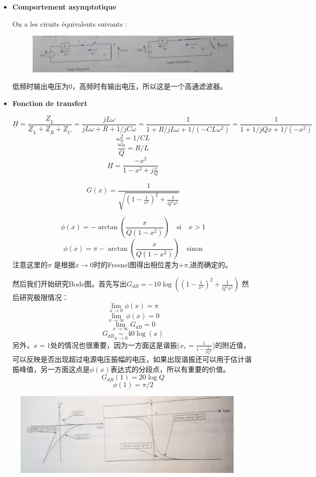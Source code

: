 \documentclass[12pt]{book}
\theoremstyle{definition}\newtheorem{dfn}{Définition}[chapter]
\theoremstyle{plain}\newtheorem{thm}{Théorème}[chapter]
\theoremstyle{plain}\newtheorem{prp}{Proposition}[chapter]
\theoremstyle{plain}\newtheorem{lem}{\bf Lemme}[chapter]
\theoremstyle{plain}\newtheorem{axm}{\bf Axiome}[chapter]
\theoremstyle{plain}\newtheorem{lmm}{\bf Lemme}[chapter]
\theoremstyle{plain}\newtheorem{cor}{\bf Corollaire}[chapter]
\theoremstyle{remark}\newtheorem{rem}{Remarque}[chapter]
\begin{document}
\begin{itemize}
	\item \textbf{Comportement asymptotique}
	
	On a les ciruits équivalents suivants :
\begin{figure}[H]
	\centering
	\includegraphics[scale=0.16]{Filtrage//6}
\end{figure}
低频时输出电压为0，高频时有输出电压，所以这是一个高通滤波器。

\item \textbf{Fonction de transfert}

$$
\underline{H}=\frac{\underline{Z}_L}{\underline{Z}_L+\underline{Z}_R+\underline{Z}_C}=\frac{jL\omega}{jL\omega+R+1/jC\omega}=\frac{1}{1+R/jL\omega+1/(-CL\omega^2)}=\frac{1}{1+1/jQx+1/(-x^2)}
$$
$$
\omega_0^2=1/CL
$$
$$
\frac{\omega_0}{Q}=R/L
$$
$$
\boxed{\underline{H}=\frac{-x^2}{1-x^2+j\frac{x}{Q}}}
$$

$$
G(x)=\frac{1}{\sqrt{(1-\frac{1}{x^2})^2+\frac{1}{Q^2x^2}}}
$$

$$
\phi(x)=-\arctan(\frac{x}{Q(1-x^2)})\quad \text{si}\quad x>1
$$
$$
\phi(x)=\pi-\arctan(\frac{x}{Q(1-x^2)})\quad \text{sinon}
$$
注意这里的$\pi$ 是根据$x\to0$时的Fresnel图得出相位差为$+\pi$,进而确定的。

然后我们开始研究Bode图。首先写出$G_{dB}=-10\log((1-\frac{1}{x^2})^2+\frac{1}{Q^2x^2})$
然后研究极限情况：
$$
\lim\limits_{x\to0}\phi(x)=\pi
$$
$$
\lim\limits_{x\to\infty}\phi(x)=0
$$
$$
\lim\limits_{x\to\infty}G_{dB}=0
$$
$$
G_{dB}\underset{x\to0}{\sim}40\log(x)
$$
另外，$x=1$处的情况也很重要，因为一方面这是谐振($x_r=\frac{1}{1-\frac{1}{2Q^2}}$)的附近值，可以反映是否出现超过电源电压振幅的电压，如果出现谐振还可以用于估计谐振峰值，另一方面这点是$\phi(x)$表达式的分段点，所以有重要的价值。
$$
G_{dB}(1)=20\log Q
$$
$$
\phi(1)=\pi/2
$$
\end{itemize}

\begin{figure}[H]
	\centering
	\includegraphics[scale=0.15]{Filtrage//7}
\end{figure}
\end{document}
